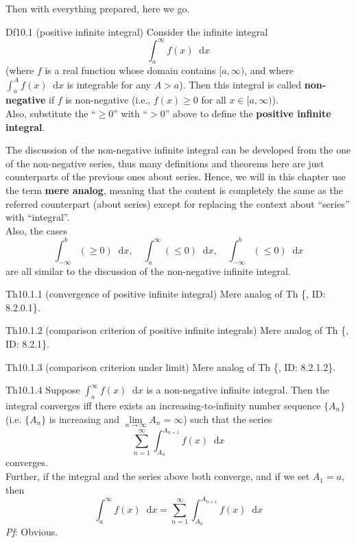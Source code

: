 \documentclass{article}
\newcommand{\dif}{\mathop{}\!\mathrm{d}}
\begin{document}
Then with everything prepared, here we go. 

\begin{Df}{Df10.1 (positive infinite integral)}
    Consider the infinite integral
    $$\int_a^{\infty} f(x)\dif x$$
    (where $f$ is a real function whose domain contains $[a, \infty)$, and where $\int_a^{A} f(x)\dif x$ is integrable for any $A>a$). Then this integral is called \textbf{non-negative} if $f$ is non-negative (i.e., $f(x)\geq 0$ for all $x\in [a, \infty)$). \\
    Also, substitute the ``$\geq 0$'' with ``$>0$'' above to define the \textbf{positive infinite integral}.
\end{Df}

\begin{Rmk}{}
    The discussion of the non-negative infinite integral can be developed from the one of the non-negative series, thus many definitions and theorems here are just counterparts of the previous ones about series. Hence, we will in this chapter use the term \textcolor{Df}{\textbf{mere analog}, meaning that the content is completely the same as the referred counterpart (about series) except for replacing the context about ``series'' with ``integral''}. \\
    Also, the cases 
    $$\int_{-\infty}^b (\geq 0) \dif x,\quad \int_a^\infty (\leq 0) \dif x,\quad \int_{-\infty}^b (\leq 0) \dif x $$
    are all similar to the discussion of the non-negative infinite integral.
\end{Rmk}

\begin{Th}{Th10.1.1 (convergence of positive infinite integral)}
    Mere analog of Th \{, ID: 8.2.0.1\}.
\end{Th}

\begin{Th}{Th10.1.2 (comparison criterion of positive infinite integrals)}
    Mere analog of Th \{, ID: 8.2.1\}.
\end{Th}

\begin{Th}{Th10.1.3 (comparison criterion under limit)}
    Mere analog of Th \{, ID: 8.2.1.2\}.
\end{Th}

\begin{Th}{Th10.1.4}
    Suppose $\int_a^\infty f(x)\dif x$ is a non-negative infinite integral. Then the integral converges iff there exists an \textcolor{Df}{increasing-to-infinity number sequence $\{A_n\}$ (i.e. $\{A_n\}$ is increasing and $\lim\limits_{n\to\infty} A_n = \infty$)} such that the series
    $$ \sum_{n=1}^\infty \int_{A_{n}}^{A_{n+1}} f(x)\dif x $$
    converges. \\
    Further, if the integral and the series above both converge, and if we set $A_1 = a$, then
    $$ \int_a^\infty f(x)\dif x = \sum_{n=1}^\infty \int_{A_{n}}^{A_{n+1}} f(x)\dif x $$
    \tcblower
    \textit{Pf}: Obvious.
\end{Th}
\end{document}
